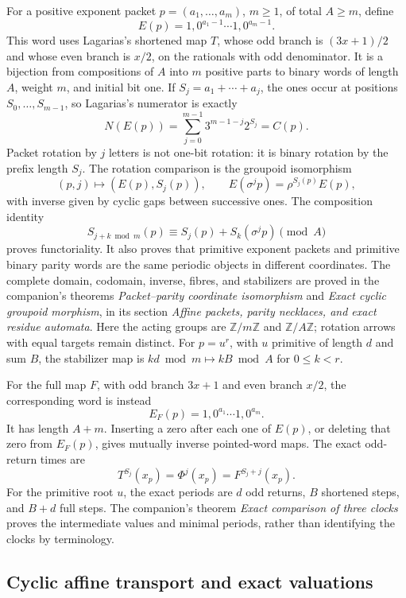 For a positive exponent packet $p=(a_1,\ldots,a_m)$, $m\ge1$, of
total $A\ge m$, define
\[
 E(p)=1,0^{a_1-1}\cdots1,0^{a_m-1}.
\]
This word uses Lagarias's shortened map $T$, whose odd branch is
$(3x+1)/2$ and whose even branch is $x/2$, on the rationals with odd
denominator.  It is a bijection from compositions of $A$ into $m$ positive parts to
binary words of length $A$, weight $m$, and initial bit one.  If
$S_j=a_1+\cdots+a_j$, the ones occur at positions
$S_0,\ldots,S_{m-1}$, so Lagarias's numerator is exactly
\[
 N(E(p))=\sum_{j=0}^{m-1}3^{m-1-j}2^{S_j}=C(p).
\]
Packet rotation by $j$ letters is not one-bit rotation: it is binary rotation
by the prefix length $S_j$.  The rotation comparison is the groupoid isomorphism
\[
 (p,j)\longmapsto(E(p),S_j(p)),
 \qquad E(\sigma^jp)=\rho^{S_j(p)}E(p),
\]
with inverse given by cyclic gaps between successive ones.  The composition
identity
\[
 S_{j+k\bmod m}(p)
 \equiv S_j(p)+S_k(\sigma^jp)\pmod A
\]
proves functoriality.  It also proves that primitive exponent packets and
primitive binary parity words are the same periodic objects in different
coordinates.  The complete domain, codomain, inverse, fibres, and stabilizers
are proved in the companion's theorems \emph{Packet--parity coordinate
isomorphism} and \emph{Exact cyclic groupoid morphism}, in its section
\emph{Affine packets, parity necklaces, and exact residue automata}.
Here the acting groups are $\mathbb Z/m\mathbb Z$ and
$\mathbb Z/A\mathbb Z$; rotation arrows with equal targets remain distinct.
For $p=u^r$, with $u$ primitive of length $d$ and sum $B$, the stabilizer
map is $kd\bmod m\mapsto kB\bmod A$ for $0\le k<r$.

For the full map $F$, with odd branch $3x+1$ and even branch $x/2$, the
corresponding word is instead
\[
 E_F(p)=1,0^{a_1}\cdots1,0^{a_m}.
\]
It has length $A+m$.  Inserting a zero after each one of $E(p)$, or deleting
that zero from $E_F(p)$, gives mutually inverse pointed-word maps.
The exact odd-return times are
\[
 T^{S_j}(x_p)=\Phi^j(x_p)=F^{S_j+j}(x_p).
\]
For the primitive root $u$, the exact periods are $d$ odd returns, $B$
shortened steps, and $B+d$ full steps.  The companion's theorem
\emph{Exact comparison of three clocks} proves the intermediate values
and minimal periods, rather than identifying the clocks by terminology.

\subsection{Cyclic affine transport and exact valuations}


